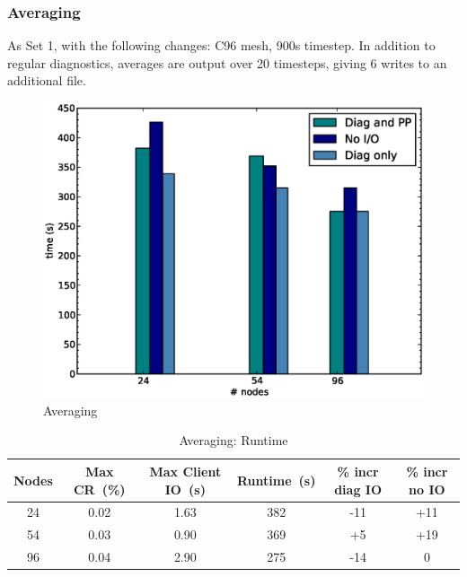 \subsubsection{Averaging}

As Set 1, with the following changes: C96 mesh, 900s timestep.
In addition to regular diagnostics, averages are output over 20 timesteps, giving 6 writes to an additional file. 

\normalsize
\begin{figure}[ht!]
  \begin{center}
   \includegraphics[scale=0.4]{figs/ave.eps}
   \caption{Averaging}
   \label{fig:fig1}
  \end{center}
\end{figure}

\begin{table}[ht!]
\scriptsize
  \begin{center}
    \caption{Averaging: Runtime}
    \label{tab:table3}
     \begin{tabular}{|c|c|c|c|c|c|}
      \textbf{Nodes} & \textbf{Max CR~(\%)} & \textbf{Max Client IO~(s)} & \textbf{Runtime~(s)} & \textbf{\% incr diag IO} & \textbf{\% incr no IO}\\
      \hline
      24 & 0.02 & 1.63 & 382 & -11 & +11 \\ 
      54 & 0.03 & 0.90 & 369 & +5 & +19 \\ 
      96 & 0.04 & 2.90 & 275 & -14 & 0 \\ 
    \end{tabular}
  \end{center}
\end{table}

